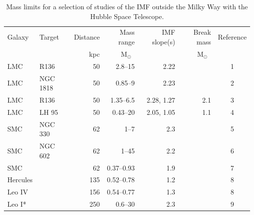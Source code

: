 \documentclass{aa}
\newcommand{\msun}{M$_\odot$~}
\begin{document}
\begin{table}

    \centering
    \caption{Mass limits for a selection of studies of the IMF outside the Milky Way with the Hubble Space Telescope. }
    \label{tbl:imf_lit_review}

    \begin{tabular}{ l l r r r r c }
        \hline
        \hline
        Galaxy   &  Target      &  Distance &  Mass range       & IMF slope(s) & Break mass          & Reference         \\
                &               & kpc       & \msun             &              & \msun               &                   \\
        \hline
        LMC      &  R136        & 50        & 2.8--15            & 2.22         &                     & 1 \\
        LMC      &  NGC 1818    & 50        & 0.85--9            & 2.23         &                     & 2  \\
        LMC      &  R136        & 50        & 1.35--6.5          & 2.28, 1.27   & 2.1                 & 3     \\
        LMC      &  LH 95       & 50        & 0.43--20           & 2.05, 1.05   & 1.1                 & 4      \\
        \hline
        SMC      &  NGC 330     & 62        & 1--7               & 2.3          &                     & 5    \\
        SMC      &  NGC 602     & 62        & 1--45              & 2.2          &                     & 6     \\
        SMC      &              & 62        & 0.37--0.93         & 1.9          &                     & 7     \\
        \hline
        Hercules &              & 135       & 0.52--0.78         & 1.2          &                     & 8         \\
        Leo IV   &              & 156       & 0.54--0.77         & 1.3          &                     & 8         \\
        Leo I*   &              & 250       & 0.6--30            & 2.3          &                     & 9     \\
        \hline
        \end{tabular}


\end{table}
\end{document}
